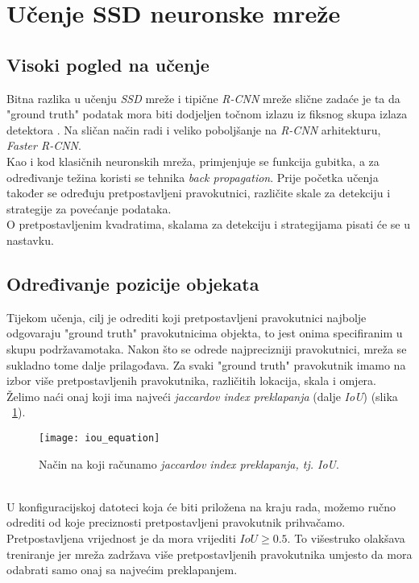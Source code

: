 \section{Učenje SSD neuronske mreže}
\subsection{Visoki pogled na učenje}
Bitna razlika u učenju \emph{SSD} mreže i tipične \emph{R-CNN} mreže slične zadaće je ta da "ground truth" podatak mora biti dodjeljen točnom izlazu iz fiksnog skupa izlaza detektora \cite{liu2016ssd}.
Na sličan način radi i veliko poboljšanje na \emph{R-CNN} arhitekturu, \emph{Faster R-CNN}. \\
Kao i kod klasičnih neuronskih mreža, primjenjuje se funkcija gubitka, a za određivanje težina koristi se tehnika \emph{back propagation}.
Prije početka učenja također se određuju pretpostavljeni pravokutnici, različite skale za detekciju i strategije za povećanje podataka. \\
O pretpostavljenim kvadratima, skalama za detekciju i strategijama pisati će se u nastavku.
\subsection{Određivanje pozicije objekata}
Tijekom učenja, cilj je odrediti koji pretpostavljeni pravokutnici najbolje odgovaraju "ground truth" pravokutnicima objekta, to jest onima specifiranim u skupu podržavamotaka.
Nakon što se odrede najprecizniji pravokutnici, mreža se sukladno tome dalje prilagođava.
Za svaki "ground truth" pravokutnik imamo na izbor više pretpostavljenih pravokutnika, različitih lokacija, skala i omjera.
Želimo naći onaj koji ima najveći \emph{jaccardov index preklapanja} (dalje \emph{IoU}) (slika ~\ref{fig:JaccardIndex}).
\begin{figure}[h!]
	\centering
	\texttt{[image: iou\_equation]}
	 \caption{Način na koji računamo \emph{jaccardov index preklapanja, tj. IoU}.}
 	 \label{fig:JaccardIndex}
\end{figure} \\
U konfiguracijskoj datoteci koja će biti priložena na kraju rada, možemo ručno odrediti od koje preciznosti pretpostavljeni pravokutnik prihvačamo.
Pretpostavljena vrijednost je da mora vrijediti $IoU \geq 0.5$.
To višestruko olakšava treniranje jer mreža zadržava više pretpostavljenih pravokutnika umjesto da mora odabrati samo onaj sa najvećim preklapanjem.

